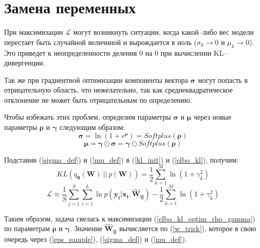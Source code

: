 \documentclass{article}
\numberwithin{equation}{section}
\begin{document}
    \section{Замена переменных}

    При максимизации $\mathcal{L}$ могут возникнуть ситуации,
    когда какой--либо вес модели перестает быть случайной величиной и вырождается в ноль
    ($\sigma_{k} \rightarrow 0$ и $\mu_{k} \rightarrow 0$).
    Это приведет к неопределенности деления 0 на 0 при вычислении KL--дивергенции.

    Так же при градиентной оптимизации компоненты вектора $\pmb{\sigma}$
    могут попасть в отрицательную область, что нежелательно,
    так как среднеквадратическое отклонение не может быть отрицательным по определению.

    Чтобы избежать этих проблем,
    определим параметры $\pmb{\sigma}$ и $\pmb{\mu}$
    через новые параметры $\pmb{\rho}$ и $\pmb{\gamma}$
    следующим образом:
    \begin{equation}\label{sigma_def}
        \pmb{\sigma}
        =
            \ln({
                1 + e^{\pmb{\rho}}
            })
        =
            Softplus (\pmb{\rho})
    \end{equation}
    \begin{equation}\label{mu_def}
        \pmb{\mu} = \pmb{\gamma} \odot \pmb{\sigma} = \pmb{\gamma} \odot Softplus (\pmb{\rho})
    \end{equation}

    Подставив (\ref{sigma_def}) и (\ref{mu_def}) в (\ref{kl_init}) и (\ref{elbo_kl}), получим:
    \begin{equation}\label{kl_optim_rho_gamma}
        KL(q_{\pmb{\theta}}(\pmb{W})~||~p(\pmb{W}))
        =
            \frac{1}{2} \sum_{k=1}^{M} \ln(
                {1 + \gamma_{k}^{2}}
            )
    \end{equation}
    \begin{equation}\label{elbo_kl_optim_rho_gamma}
        \mathcal{L}
        \approx
            \frac{1}{S} \sum_{j=1}^S \sum_{i=1}^{L} {
                \ln{
                    p(\pmb{y_{i}} | \pmb{x_{i}}, \pmb{\hat{W}_{ij}})
                }
            }
        -
            \frac{1}{2} \sum_{k=1}^{M} \ln(
                {1 + \gamma_{k}^{2}}
            )
    \end{equation}

    Таким образом, задача свелась к максимизации (\ref{elbo_kl_optim_rho_gamma})
    по параметрам $\pmb{\rho}$ и $\pmb{\gamma}$.
    Значение $\pmb{\hat{W}_{ij}}$ вычисляется по (\ref{w_trick}),
    которое в свою очередь через
    (\ref{eps_sample}), (\ref{sigma_def}) и (\ref{mu_def}).
\end{document}

